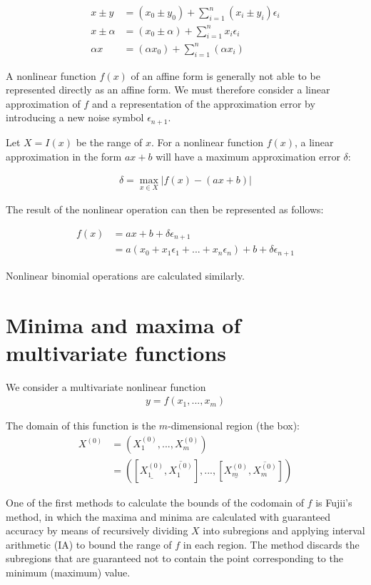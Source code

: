 \documentclass[fontsize=12pt,a4paper]{scrartcl} %
\begin{document}
\begin{align}
    x \pm y &= (x_0 \pm y_0) + \sum_{i=1}^n (x_i \pm y_i) \epsilon_i\\
    x \pm \alpha &= (x_0 \pm \alpha) + \sum_{i=1}^n x_i \epsilon_i\\
    \alpha x &= (\alpha x_0) + \sum_{i=1}^n (\alpha x_i)
\end{align}

A nonlinear function $f(x)$ of an affine form is generally not able to be represented directly as an affine form. We must therefore consider a linear approximation of $f$ and a representation of the approximation error by introducing a new noise symbol $\epsilon_{n+1}$.

Let $X = I(x)$ be the range of $x$. For a nonlinear function $f(x)$, a linear approximation in the form $ax + b$ will have a maximum approximation error $\delta$:

\begin{align}
    \delta = \max_{x \in X} | f(x) - (ax + b) |
\end{align}

The result of the nonlinear operation can then be represented as follows:

\begin{align}
    f(x) &= ax + b + \delta \epsilon_{n+1}\\
         &= a(x_0 + x_1 \epsilon_1 + ... + x_n \epsilon_n) + b + \delta \epsilon_{n+1}
\end{align}

Nonlinear binomial operations are calculated similarly.

\section{Minima and maxima of multivariate functions}

We consider a multivariate nonlinear function
\begin{align}
    y = f(x_1, ..., x_m)
\end{align}

The domain of this function is the $m$-dimensional region (the box):
\begin{align}
    X^{(0)} &= \left( X_1^{(0)}, ..., X_m^{(0)}  \right)\\
            &= \left( [\underline{X_1^{(0)}}, \overline{X_1^{(0)}}], ..., [\underline{X_m^{(0)}}, \overline{X_m^{(0)}}] \right)
\end{align}

One of the first methods to calculate the bounds of the codomain of $f$ is Fujii's method, in which the maxima and minima are calculated with guaranteed accuracy by means of recursively dividing $X$ into subregions and applying interval arithmetic (IA) to bound the range of $f$ in each region. The method discards the subregions that are guaranteed not to contain the point corresponding to the minimum (maximum) value. 
\end{document}
